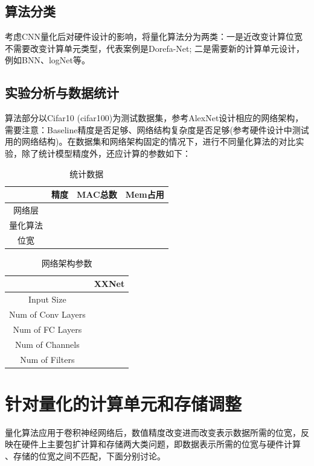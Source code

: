 \documentclass[UTF8]{scrartcl}
\begin{document}
	  \subsection{算法分类}
	  考虑CNN量化后对硬件设计的影响，将量化算法分为两类：一是近改变计算位宽不需要改变计算单元类型，代表案例是Dorefa-Net; 二是需要新的计算单元设计，例如BNN、logNet等。
	  
	  \subsection{实验分析与数据统计}
	   算法部分以Cifar10 (cifar100)为测试数据集，参考AlexNet设计相应的网络架构，需要注意：Baseline精度是否足够、网络结构复杂度是否足够(参考硬件设计中测试用的网络结构)。在数据集和网络架构固定的情况下，进行不同量化算法的对比实验，除了统计模型精度外，还应计算的参数如下：
	   
	   \begin{table}[h]
	   	\centering
	   	\caption{统计数据}
	   	\begin{tabular*}{8cm}{c |c| c |c }
	   		\hline
	   	       & 精度  &  MAC总数  & Mem占用   \\
	   	     \hline
	   	     网络层& & &\\
	   	     \hline
	   	     量化算法& & &\\
	   	     \hline
	   	     位宽& & &\\
	   	    \hline
	   		
	   		
	   	\end{tabular*}	
	   \end{table}
	   
	    \begin{table}[h]
	    	\centering
	    	\caption{网络架构参数}
	    	\begin{tabular*}{8cm}{c |c|  }
	    		\hline
	    		& XXNet       \\
	    		\hline
	    	     Input Size& \\
	    		\hline
	    		Num of Conv Layers & \\
	    		\hline
	    	   Num of FC Layers& \\
	    	    \hline
	    	    Num of Channels & \\
	    	    \hline
	    	    Num of Filters & \\
	    		\hline
	    		
	    		
	    	\end{tabular*}	
	    \end{table}
  
  \section{针对量化的计算单元和存储调整}
	  量化算法应用于卷积神经网络后，数值精度改变进而改变表示数据所需的位宽，反映在硬件上主要包扩计算和存储两大类问题，即数据表示所需的位宽与硬件计算 、存储的位宽之间不匹配，下面分别讨论。
\end{document}
